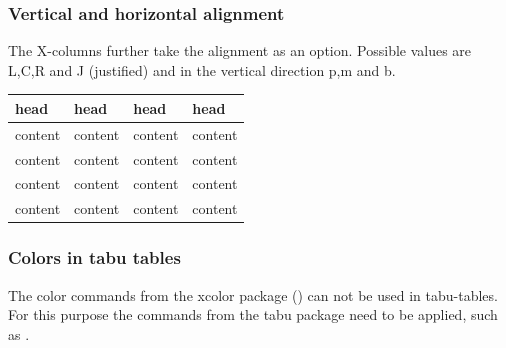 \subsubsection{Vertical and horizontal alignment}

The X-columns further take the alignment as an option. Possible values are L,C,R and J (justified) and in the vertical direction p,m and b.

%


\begin{filecontents*}{\democodefile}
\begin{center}
\small\sffamily\renewcommand{\arraystretch}{1.4}  
\begin{tabu} to 0.9\textwidth {X[1,l]X[1,c]X[1,c]X[1,c]}
\hline
\rowfont[c]{\bfseries}
head    & head    & head    & head    \\
\hline
{}
content & content & content & content \\
content & content & content & content\\
content & content & content & content\\
content & content & content & content\\
\hline
\end{tabu}
\end{center}	
\end{filecontents*}

\subsubsection{Colors in tabu tables}
\label{sec:tabletabucolor}

The color commands from the xcolor package () can not be used in tabu-tables. For this purpose the commands from the tabu package need to be applied, such as .

%


